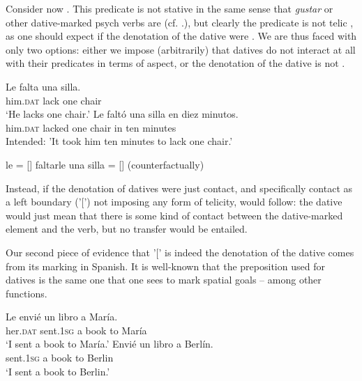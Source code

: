 \documentclass[output=paper,colorlinks,citecolor=brown,nonflat]{./langscibook}
\begin{document}
Consider now . This predicate is not stative in the same sense that \textit{gustar} or other dative-marked psych verbs are (cf. .), but clearly the predicate is not telic , as one should expect if the denotation of the dative  were . We are thus faced with only two options: either we impose (arbitrarily) that datives do not interact at all with their predicates in terms of aspect, or the denotation of the dative is not .

\ea%
    \label{ex:fabregas:19}
    \ea\label{ex:fabregas:19a}
    \gll    Le       falta   una silla.\\
            {him.}\textsc{dat}  {lack}  {one} {chair}\\
    \glt `He lacks one chair.' 
    \ex\label{ex:fabregas:19b}
    \gll    *Le           faltó     una silla  en diez minutos.\\
            him.\textsc{dat}    lacked  one chair in  ten  minutes\\
    \glt    Intended: 'It took him ten minutes to lack one chair.'
    \z
\z

\ea%
    \label{ex:fabregas:20}
    \ea\label{ex:fabregas:20a}
    le              =     [{\midline}]
    \ex\label{ex:fabregas:20b}
    faltarle una silla    =    [{\midline}] (counterfactually)
    \z
\z

Instead, if the denotation of datives were just contact, and specifically contact as a left boundary ('[') not imposing any form of telicity,  would follow: the dative would just mean that there is some kind of contact between the dative-marked element and the verb, but no transfer would be entailed. 

Our second piece of evidence that '[' is indeed the denotation of the dative comes from its marking in Spanish. It is well-known that the preposition used for datives  is the same one that one sees to mark spatial goals  – among other functions.

\ea%
    \label{ex:fabregas:21}
    \ea\label{ex:fabregas:21a}
    \gll    Le     envié     un libro  a  María.\\
            {her.}\textsc{dat}  {sent.1}\textsc{sg}     {a}   {book} {to} {María}\\
    \glt `I sent a book to María.'
    \ex\label{ex:fabregas:21b}
    \gll    Envié     un libro a  Berlín.\\
            {sent.1}\textsc{sg}    {a}  {book} {to} {Berlin}\\
    \glt `I sent a book to Berlin.'
    \z
\z
\end{document}
